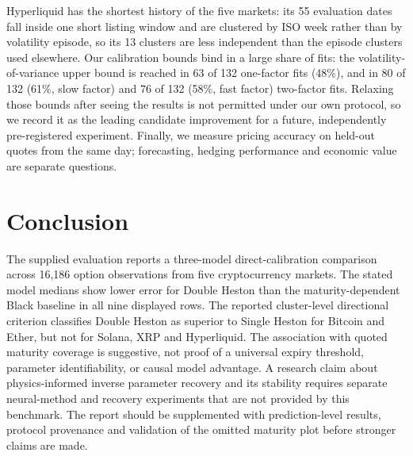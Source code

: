 \documentclass[runningheads]{llncs}
\begin{document}
Hyperliquid has the shortest history of the five markets: its 55
evaluation dates fall inside one short listing window and are clustered
by ISO week rather than by volatility episode, so its 13 clusters are
less independent than the episode clusters used elsewhere. Our
calibration bounds bind in a large share of fits: the
volatility-of-variance upper bound is reached in 63 of 132 one-factor
fits (48\%), and in 80 of 132 (61\%, slow factor) and 76 of 132 (58\%,
fast factor) two-factor fits. Relaxing those bounds after seeing the
results is not permitted under our own protocol, so we record it as the
leading candidate improvement for a future, independently pre-registered
experiment. Finally, we measure pricing accuracy on held-out quotes from
the same day; forecasting, hedging performance and economic value are
separate questions.

\section{Conclusion}
\label{sec:conclusion}

The supplied evaluation reports a three-model direct-calibration
comparison across 16,186 option observations from five cryptocurrency
markets. The stated model medians show lower error for Double Heston
than the maturity-dependent Black baseline in all nine displayed rows.
The reported cluster-level directional criterion classifies Double
Heston as superior to Single Heston for Bitcoin and Ether, but not for
Solana, XRP and Hyperliquid. The association with quoted maturity
coverage is suggestive, not proof of a universal expiry threshold,
parameter identifiability, or causal model advantage. A research claim
about physics-informed inverse parameter recovery and its stability
requires separate neural-method and recovery experiments that are not
provided by this benchmark. The report should be supplemented with
prediction-level results, protocol provenance and validation of the
omitted maturity plot before stronger claims are made.
\end{document}
